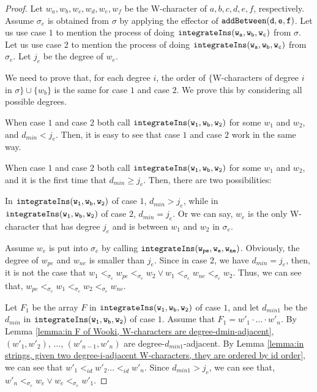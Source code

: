 \begin {proof}
Let $w_a,w_b,w_c,w_d,w_e,w_f$ be the W-character of $a,b,c,d,e,f$, respectively. Assume $\sigma_e$ is obtained from $\sigma$ by applying the effector of $\alabelshort[{\tt addBetween}]{d,e,f}$. Let us use case $1$ to mention the process of doing $\alabelshort[{\tt integrateIns}]{w_a,w_b,w_c}$ from $\sigma$. Let us use case $2$ to mention the process of doing $\alabelshort[{\tt integrateIns}]{w_a,w_b,w_c}$ from $\sigma_e$. Let $j_e$ be the degree of $w_e$.

We need to prove that, for each degree $i$, the order of $\{$W-characters of degree $i$ in $\sigma \} \cup \{ w_b \}$ is the same for case $1$ and case $2$. We prove this by considering all possible degrees.

When case $1$ and case $2$ both call $\alabelshort[{\tt integrateIns}]{w_1,w_b,w_2}$ for some $w_1$ and $w_2$, and $d_{min}<j_e$. Then, it is easy to see that case $1$ and case $2$ work in the same way.

When case $1$ and case $2$ both call $\alabelshort[{\tt integrateIns}]{w_1,w_b,w_2}$ for some $w_1$ and $w_2$, and it is the first time that $d_{min} \geq j_e$. Then, there are two possibilities:

 In $\alabelshort[{\tt integrateIns}]{w_1,w_b,w_2}$ of case $1$, $d_{min} > j_e$, while in $\alabelshort[{\tt integrateIns}]{w_1,w_b,w_2}$ of case $2$, $d_{min} = j_e$. Or we can say, $w_e$ is the only W-character that has degree $j_e$ and is between $w_1$ and $w_2$ in $\sigma_e$.

Assume $w_e$ is put into $\sigma_e$ by calling $\alabelshort[{\tt integrateIns}]{w_{pe},w_e,w_{ne}}$. Obviously, the degree of $w_{pe}$ and $w_{ne}$ is smaller than $j_e$. Since in case $2$, we have $d_{min} = j_e$, then, it is not the case that $w_1 <_{\sigma_e} w_{pe} <_{\sigma_e} w_2 \vee w_1 <_{\sigma_e} w_{ne} <_{\sigma_e} w_2$. Thus, we can see that, $w_{pe} <_{\sigma_e} w_1 <_{\sigma_e} w_2 <_{\sigma_e} w_{ne}$.

Let $F_1$ be the array $F$ in $\alabelshort[{\tt integrateIns}]{w_1,w_b,w_2}$ of case $1$, and let $d_{min1}$ be the $d_{min}$ in $\alabelshort[{\tt integrateIns}]{w_1,w_b,w_2}$ of case $1$. Assume that $F_1 = w'_1 \cdot \ldots \cdot w'_n$. By Lemma \ref{lemma:in F of Wooki, W-characters are degree-dmin-adjacent}, $(w'_1,w'_2)$, $\ldots$, $(w'_{n-1},w'_n)$ are degree-$d_{min1}$-adjacent. By Lemma \ref{lemma:in strings, given two degree-i-adjacent W-characters, they are ordered by id order}, we can see that $w'_1 <_{id} w'_2 \ldots <_{id} w'_n$. Since $d_{min1} > j_e$, we can see that, $w'_n <_{\sigma_e} w_e \vee w_e <_{\sigma_e} w'_1$.


\end{proof}
